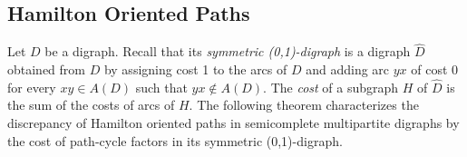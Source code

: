 \documentclass{article}
\newcommand{\2}{\vspace{0.2cm}}
\begin{document}

\subsection{Hamilton Oriented Paths} \label{HOP}


Let $D$ be a digraph. Recall that its {\em symmetric (0,1)-digraph} is a digraph $\hat{D}$ obtained from $D$ by assigning cost 1 to the arcs of $D$ and adding arc $yx$ of cost 0 for every $xy\in A(D)$
such that $yx\not\in A(D)$.
The {\em cost}  of a subgraph $H$ of $\hat{D}$ is the sum of the costs of arcs of $H.$ The following theorem characterizes the discrepancy of Hamilton oriented paths in semicomplete multipartite digraphs by the cost of path-cycle factors in its symmetric (0,1)-digraph.\\
\end{document}
